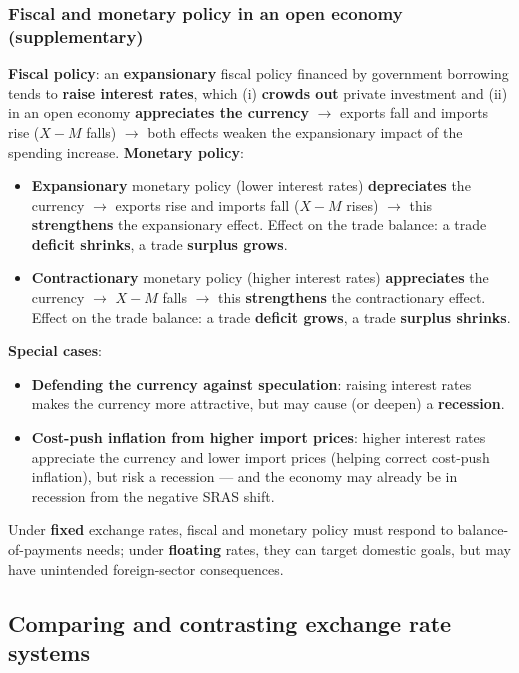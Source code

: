 \documentclass[a4paper,12pt]{article}
\begin{document}
\subsubsection*{Fiscal and monetary policy in an open economy (supplementary)}
\textbf{Fiscal policy}: an \textbf{expansionary} fiscal policy financed by government borrowing tends to \textbf{raise interest rates}, which (i) \textbf{crowds out} private investment and (ii) in an open economy \textbf{appreciates the currency} $\to$ exports fall and imports rise ($X - M$ falls) $\to$ both effects weaken the expansionary impact of the spending increase.
\textbf{Monetary policy}:
\begin{itemize}
  \item \textbf{Expansionary} monetary policy (lower interest rates) \textbf{depreciates} the currency $\to$ exports rise and imports fall ($X - M$ rises) $\to$ this \textbf{strengthens} the expansionary effect. Effect on the trade balance: a trade \textbf{deficit shrinks}, a trade \textbf{surplus grows}.
  \item \textbf{Contractionary} monetary policy (higher interest rates) \textbf{appreciates} the currency $\to$ $X - M$ falls $\to$ this \textbf{strengthens} the contractionary effect. Effect on the trade balance: a trade \textbf{deficit grows}, a trade \textbf{surplus shrinks}.
\end{itemize}
\textbf{Special cases}:
\begin{itemize}
  \item \textbf{Defending the currency against speculation}: raising interest rates makes the currency more attractive, but may cause (or deepen) a \textbf{recession}.
  \item \textbf{Cost-push inflation from higher import prices}: higher interest rates appreciate the currency and lower import prices (helping correct cost-push inflation), but risk a recession --- and the economy may already be in recession from the negative SRAS shift.
\end{itemize}
Under \textbf{fixed} exchange rates, fiscal and monetary policy must respond to balance-of-payments needs; under \textbf{floating} rates, they can target domestic goals, but may have unintended foreign-sector consequences.

\subsection{Comparing and contrasting exchange rate systems}
\end{document}
